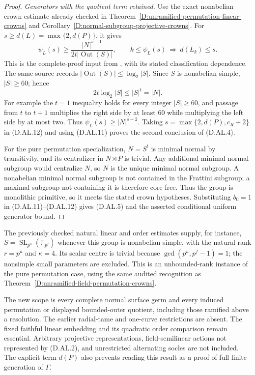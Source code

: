 \begin{proof}
\emph{Generators with the quotient term retained.}
Use the exact nonabelian crown estimate already checked
in Theorem~\ref{D:unramified-permutation-linear-crowns}
and Corollary~\ref{D:normal-subgroup-projective-crowns}.
For $s\ge d(L)=\max\{2,d(P)\}$, it gives
\[
 \psi_L(s)\ge\frac{|N|^{s-1}}
                         {2t|\operatorname{Out}(S)|},
 \qquad k\le\psi_L(s)\ \Longrightarrow\ d(L_k)\le s.
                                                        \tag{D.AL.12}
\]
This is the complete-proof input from
\citet[Proposition 2.6(ii), equations (2.1)--(2.2),
pp.~11--13]{LucchiniMarionTracey2020D}, with its stated
classification dependence. The same source records
$|\operatorname{Out}(S)|\le\log_2|S|$. Since $S$ is
nonabelian simple, $|S|\ge60$; hence
\[
                  2t\log_2|S|\le |S|^t=|N|.             \tag{D.AL.13}
\]
For example the $t=1$ inequality holds for every integer
$|S|\ge60$, and passage from $t$ to $t+1$ multiplies
the right side by at least $60$ while multiplying the
left side by at most two. Thus
$\psi_L(s)\ge|N|^{s-2}$.
Taking $s=\max\{2,d(P),c_R+2\}$ in (D.AL.12) and using
(D.AL.11) proves the second conclusion of (D.AL.4).

For the pure permutation specialization, $N=S^t$ is
minimal normal by transitivity, and its centralizer in
$N\rtimes P$ is trivial. Any additional minimal normal
subgroup would centralize $N$, so $N$ is the unique
minimal normal subgroup. A nonabelian minimal normal
subgroup is not contained in the Frattini subgroup;
a maximal subgroup not containing it is therefore
core-free. Thus the group is monolithic primitive,
so it meets the stated crown hypotheses. Substituting
$b_0=1$ in (D.AL.11)--(D.AL.12) gives (D.AL.5) and the
asserted conditional uniform generator bound.
\end{proof}

\begin{remark}
The previously checked natural linear and order estimates
supply, for instance, $S=\operatorname{SL}_{p^u}(\mathbb F_{p^f})$
whenever this group is nonabelian simple, with the natural
rank $r=p^u$ and $\kappa=4$. Its scalar centre is trivial
because $\gcd(p^u,p^f-1)=1$; the nonsimple small parameters
are excluded. This is an unbounded-rank instance of the
pure permutation case, using the same audited recognition
as Theorem~\ref{D:unramified-field-permutation-crowns}.

The new scope is every complete normal surface germ and
every induced permutation or displayed bounded-outer
quotient, including those ramified above a resolution.
The earlier radial-tame and one-curve restrictions are
absent. The fixed faithful linear embedding and its
quadratic order comparison remain essential. Arbitrary
projective representations, field-semilinear actions
not represented by (D.AL.2), and unrestricted alternating
socles are not included. The explicit term $d(P)$ also
prevents reading this result as a proof of full finite
generation of $\Gamma$.
\end{remark}
